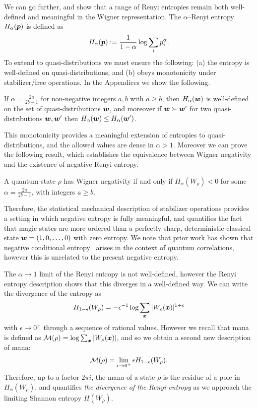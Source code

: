 \documentclass[pra,
aps,
twocolumn,
superscriptaddress,
groupedaddress,
nofootinbib,
reprint
]{revtex4-1}
\begin{document}
We can go further, and show that a range of Renyi entropies remain both well-defined and meaningful in the Wigner representation. The $\alpha$--Renyi entropy $H_\alpha(\boldsymbol{p})$ is defined as
\begin{equation}
	H_\alpha(\boldsymbol{p}) := \frac{1}{1-\alpha} \log \sum_i p_i^\alpha.
\end{equation}
To extend to quasi-distributions we must ensure the following: (a) the entropy is well-defined on quasi-distributions, and (b) obeys monotonicity under stabilizer/free operations. In the Appendices we show the following.
\begin{theorem}\label{thm:HSchur} 
	If $\alpha = \frac{2a}{2b-1}$ for non-negative integers $a,b$ with $a \geq b$, then $H_\alpha(\boldsymbol{w})$ is well-defined on the set of quasi-distributions $\boldsymbol{w}$, and moreover if $\boldsymbol{w} \succ \boldsymbol{w}'$ for two quasi-distributions $\boldsymbol{w}, \boldsymbol{w}'$ then $H_\alpha (\boldsymbol{w}) \leq H_\alpha(\boldsymbol{w}')$.
\end{theorem}
This monotonicity provides a meaningful extension of entropies to quasi-distributions, and the allowed values are dense in $\alpha >1$. Moreover we can prove the following result, which establishes the equivalence between Wigner negativity and the existence of negative Renyi entropy.
\begin{theorem}\label{thm:Magic}
	A quantum state $\rho$ has Wigner negativity if and only if $H_\alpha(W_\rho) <0$ for some $\alpha =  \frac{2a}{2b-1}$, with integers $a \ge b$.
\end{theorem}
Therefore, the statistical mechanical description of stabilizer operations provides a setting in which negative entropy is fully meaningful, and quantifies the fact that magic states are more ordered than a perfectly sharp, deterministic classical state $\boldsymbol{w} = (1,0, \dots , 0)$ with zero entropy. We note that prior work has shown that negative conditional entropy~\cite{rio_thermodynamic_2011} arises in the context of quantum correlations, however this is unrelated to the present negative entropy.

The $\alpha \rightarrow 1$ limit of the Renyi entropy is not well-defined, however the Renyi entropy description shows that this diverges in a well-defined way. We can write the divergence of the entropy as 
\begin{equation}
H_{1-\epsilon}(W_\rho) = -\epsilon^{-1} \log \sum_{\boldsymbol{x}} |W_\rho (\boldsymbol{x})|^{1+\epsilon}
\end{equation} 
with $\epsilon \rightarrow 0^+$ through a sequence of rational values. However we recall that mana is defined as ${\mathcal M}(\rho) = \log \sum_{\boldsymbol{x}} |W_\rho(\boldsymbol{x})|$, and so we obtain a second new description of mana:
\begin{equation}
{\mathcal M}(\rho) = \lim_{\epsilon \rightarrow 0^+} \epsilon H_{1-\epsilon}(W_\rho).
\end{equation}
Therefore, up to a factor $2\pi i$, the mana of a state $\rho$ is the residue of a pole in $H_\alpha(W_\rho)$, and quantifies \emph{the divergence of the Renyi-entropy} as we approach the limiting Shannon entropy $H(W_\rho)$. 
\end{document}

